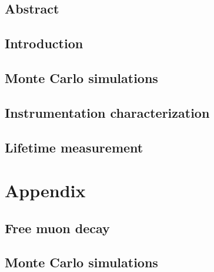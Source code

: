 \documentclass[a4paper, 12pt]{report}
\begin{document}
	




\tableofcontents


\chapter*{Abstract}


\chapter{Introduction}
\label{intro}
\setcounter{page}{1}


\chapter{Monte Carlo simulations}  
    


\chapter{Instrumentation characterization}


\chapter{Lifetime measurement}


\part*{Appendix}

\appendix

\chapter{Free muon decay}
\label{Appendix A}


\chapter{Monte Carlo simulations}
\label{Appendix B}

\end{document}
